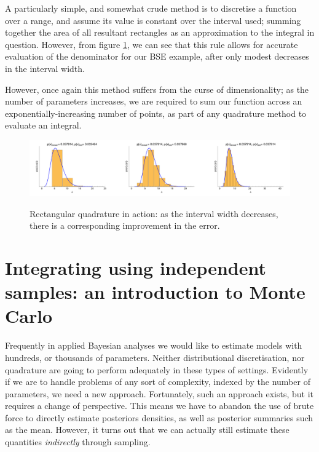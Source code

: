 \documentclass[11pt,fullpage]{book}
\begin{document}
A particularly simple, and somewhat crude method is to discretise a function over a range, and assume its value is constant over the interval used; summing together the area of all resultant rectangles as an approximation to the integral in question. However, from figure \ref{fig:MCMC_quadratureBSE}, we can see that this rule allows for accurate evaluation of the denominator for our BSE example, after only modest decreases in the interval width.

However, once again this method suffers from the curse of dimensionality; as the number of parameters increases, we are required to sum our function across an exponentially-increasing number of points, as part of any quadrature method to evaluate an integral.

\begin{figure}
\centering
\scalebox{0.25} 
{\includegraphics{MCMC_quadratureBSE.pdf}}
\caption{Rectangular quadrature in action: as the interval width decreases, there is a corresponding improvement in the error.}\label{fig:MCMC_quadratureBSE}
\end{figure}

\section{Integrating using independent samples: an introduction to Monte Carlo}\label{sec:MCMC_integratingUsingIndependentSampling}
Frequently in applied Bayesian analyses we would like to estimate models with hundreds, or thousands of parameters. Neither distributional discretisation, nor quadrature are going to perform adequately in these types of settings. Evidently if we are to handle problems of any sort of complexity, indexed by the number of parameters, we need a new approach. Fortunately, such an approach exists, but it requires a change of perspective. This means we have to abandon the use of brute force to directly estimate posteriors densities, as well as posterior summaries such as the mean. However, it turns out that we can actually still estimate these quantities \textit{indirectly} through sampling.
\end{document}
